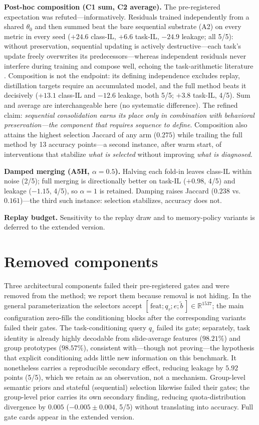 \documentclass{article}
\begin{document}
\textbf{Post-hoc composition (C1 sum, C2 average).} The pre-registered expectation was refuted---informatively. Residuals trained independently from a shared $\theta_0$ and then summed beat the bare sequential substrate (A2) on every metric in every seed ($+24.6$ class-IL, $+6.6$ task-IL, $-24.9$ leakage; all 5/5): without preservation, sequential updating is actively destructive---each task's update freely overwrites its predecessors---whereas independent residuals never interfere during training and compose well, echoing the task-arithmetic literature \cite{ilharco2023task}. Composition is not the endpoint: its defining independence excludes replay, distillation targets require an accumulated model, and the full method beats it decisively ($+13.1$ class-IL and $-12.6$ leakage, both 5/5; $+3.8$ task-IL, 4/5). Sum and average are interchangeable here (no systematic difference). The refined claim: \emph{sequential consolidation earns its place only in combination with behavioral preservation---the component that requires sequence to define}. Composition also attains the highest selection Jaccard of any arm ($0.275$) while trailing the full method by 13 accuracy points---a second instance, after warm start, of interventions that stabilize \emph{what is selected} without improving \emph{what is diagnosed}.

\textbf{Damped merging (A5H, $\alpha{=}0.5$).} Halving each fold-in leaves class-IL within noise (2/5); full merging is directionally better on task-IL ($+0.98$, 4/5) and leakage ($-1.15$, 4/5), so $\alpha{=}1$ is retained. Damping raises Jaccard ($0.238$ vs.\ $0.161$)---the third such instance: selection stabilizes, accuracy does not.

\textbf{Replay budget.} Sensitivity to the replay draw and to memory-policy variants is deferred to the extended version.

\section{Removed components}
\label{sec:removed}
Three architectural components failed their pre-registered gates and were removed from the method; we report them because removal is not hiding. In the general parameterization the selectors accept $[\,\mathrm{feat};q_\tau;e;\tilde b\,]\in\mathbb{R}^{1537}$; the main configuration zero-fills the conditioning blocks after the corresponding variants failed their gates. The task-conditioning query $q_\tau$ failed its gate; separately, task identity is already highly decodable from slide-average features ($98.21\%$) and group prototypes ($98.57\%$), consistent with---though not proving---the hypothesis that explicit conditioning adds little new information on this benchmark. It nonetheless carries a reproducible secondary effect, reducing leakage by $5.92$ points (5/5), which we retain as an observation, not a mechanism. Group-level semantic priors and stateful (sequential) selection likewise failed their gates; the group-level prior carries its own secondary finding, reducing quota-distribution divergence by $0.005$ ($-0.005{\pm}0.004$, 5/5) without translating into accuracy. Full gate cards appear in the extended version.
\end{document}
